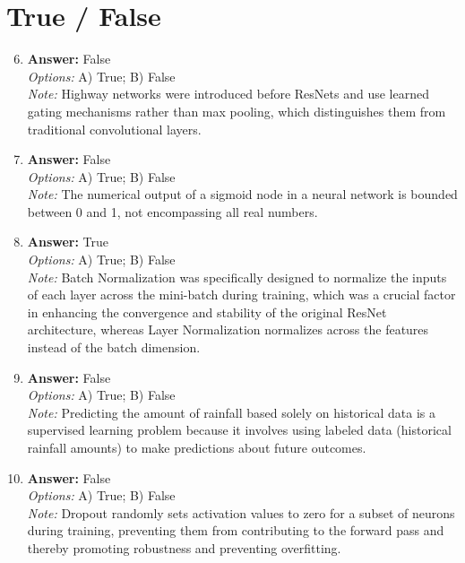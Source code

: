 \documentclass[12pt]{article}
\begin{document}
\section*{True / False}
\begin{enumerate}[label=\arabic*.]
\setcounter{enumi}{5}
\item \textbf{Answer:} False
\\ \textit{Options:} A) True; B) False
\\ \textit{Note:} Highway networks were introduced before ResNets and use learned gating mechanisms rather than max pooling, which distinguishes them from traditional convolutional layers.
\item \textbf{Answer:} False
\\ \textit{Options:} A) True; B) False
\\ \textit{Note:} The numerical output of a sigmoid node in a neural network is bounded between 0 and 1, not encompassing all real numbers.
\item \textbf{Answer:} True
\\ \textit{Options:} A) True; B) False
\\ \textit{Note:} Batch Normalization was specifically designed to normalize the inputs of each layer across the mini-batch during training, which was a crucial factor in enhancing the convergence and stability of the original ResNet architecture, whereas Layer Normalization normalizes across the features instead of the batch dimension.
\item \textbf{Answer:} False
\\ \textit{Options:} A) True; B) False
\\ \textit{Note:} Predicting the amount of rainfall based solely on historical data is a supervised learning problem because it involves using labeled data (historical rainfall amounts) to make predictions about future outcomes.
\item \textbf{Answer:} False
\\ \textit{Options:} A) True; B) False
\\ \textit{Note:} Dropout randomly sets activation values to zero for a subset of neurons during training, preventing them from contributing to the forward pass and thereby promoting robustness and preventing overfitting.
\end{enumerate}
\end{document}
